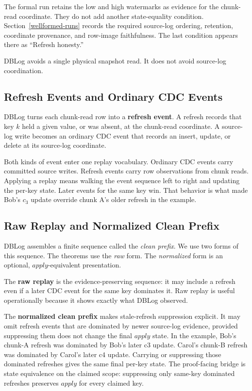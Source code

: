 \documentclass[letterpaper,10pt,twocolumn]{article}
\newcommand{\Apply}{\mathit{apply}}
\begin{document}
The formal run retains the low and high watermarks as evidence for the
chunk-read coordinate. They do not add another state-equality
condition. Section~\ref{wellformed-runs} records the required source-log
ordering, retention, coordinate provenance, and row-image faithfulness.
The last condition appears there as ``Refresh honesty.''

DBLog avoids a single physical snapshot read. It does not avoid
source-log coordination.

\subsection{Refresh Events and Ordinary CDC
Events}\label{refresh-events-and-ordinary-cdc-events}

DBLog turns each chunk-read row into a \textbf{refresh event}. A refresh
records that key $k$ held a given value, or was absent, at the
chunk-read coordinate. A source-log write becomes an ordinary CDC event
that records an insert, update, or delete at its source-log coordinate.

Both kinds of event enter one replay vocabulary. Ordinary CDC events
carry committed source writes. Refresh events carry row observations
from chunk reads. Applying a replay means walking the event sequence
left to right and updating the per-key state. Later events for the same
key win. That behavior is what made Bob's $c_3$ update
override chunk A's older refresh in the example.

\subsection{Raw Replay and Normalized Clean
Prefix}\label{raw-replay-and-normalized-clean-prefix}

DBLog assembles a finite sequence called the \emph{clean prefix}. We use
two forms of this sequence. The theorems use the \emph{raw} form. The
\emph{normalized} form is an optional, $\Apply$-equivalent presentation.

The \textbf{raw replay} is the evidence-preserving sequence: it may
include a refresh even if a later CDC event for the same key dominates
it. Raw replay is useful operationally because it shows exactly what
DBLog observed.

The \textbf{normalized clean prefix} makes stale-refresh suppression
explicit. It may omit refresh events that are dominated by newer
source-log evidence, provided suppressing them does not change the final
$\Apply$ state. In the example, Bob's chunk-A refresh was
dominated by Bob's later c3 update. Carol's chunk-B refresh was
dominated by Carol's later c4 update. Carrying or suppressing those
dominated refreshes gives the same final per-key state. The proof-facing
bridge is state equivalence on the claimed scope: suppressing only
same-key dominated refreshes preserves $\Apply$ for every claimed
key.
\end{document}
